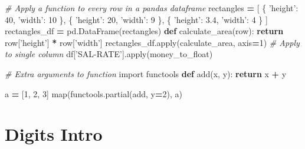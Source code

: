 \documentclass[]{book}
\newenvironment{Shaded}{\begin{snugshade}}{\end{snugshade}}
\newcommand{\KeywordTok}[1]{\textcolor[rgb]{0.13,0.29,0.53}{\textbf{#1}}}
\newcommand{\DecValTok}[1]{\textcolor[rgb]{0.00,0.00,0.81}{#1}}
\newcommand{\FloatTok}[1]{\textcolor[rgb]{0.00,0.00,0.81}{#1}}
\newcommand{\StringTok}[1]{\textcolor[rgb]{0.31,0.60,0.02}{#1}}
\newcommand{\ImportTok}[1]{#1}
\newcommand{\CommentTok}[1]{\textcolor[rgb]{0.56,0.35,0.01}{\textit{#1}}}
\newcommand{\ControlFlowTok}[1]{\textcolor[rgb]{0.13,0.29,0.53}{\textbf{#1}}}
\newcommand{\OperatorTok}[1]{\textcolor[rgb]{0.81,0.36,0.00}{\textbf{#1}}}
\newcommand{\BuiltInTok}[1]{#1}
\newcommand{\NormalTok}[1]{#1}
\theoremstyle{definition}
\theoremstyle{definition}
\theoremstyle{definition}
\theoremstyle{remark}
\begin{document}
\begin{Shaded}
\begin{Highlighting}[]
\CommentTok{# Apply a function to every row in a pandas dataframe}
\NormalTok{rectangles }\OperatorTok{=}\NormalTok{ [}
\NormalTok{    \{ }\StringTok{'height'}\NormalTok{: }\DecValTok{40}\NormalTok{, }\StringTok{'width'}\NormalTok{: }\DecValTok{10}\NormalTok{ \},}
\NormalTok{    \{ }\StringTok{'height'}\NormalTok{: }\DecValTok{20}\NormalTok{, }\StringTok{'width'}\NormalTok{: }\DecValTok{9}\NormalTok{ \},}
\NormalTok{    \{ }\StringTok{'height'}\NormalTok{: }\FloatTok{3.4}\NormalTok{, }\StringTok{'width'}\NormalTok{: }\DecValTok{4}\NormalTok{ \}}
\NormalTok{]}
\NormalTok{rectangles_df }\OperatorTok{=}\NormalTok{ pd.DataFrame(rectangles)}
\KeywordTok{def}\NormalTok{ calculate_area(row):}
    \ControlFlowTok{return}\NormalTok{ row[}\StringTok{'height'}\NormalTok{] }\OperatorTok{*}\NormalTok{ row[}\StringTok{'width'}\NormalTok{]}
\NormalTok{rectangles_df.}\BuiltInTok{apply}\NormalTok{(calculate_area, axis}\OperatorTok{=}\DecValTok{1}\NormalTok{)}
\CommentTok{# Apply to single column}
\NormalTok{df[}\StringTok{'SAL-RATE'}\NormalTok{].}\BuiltInTok{apply}\NormalTok{(money_to_float)}
\end{Highlighting}
\end{Shaded}

\begin{Shaded}
\begin{Highlighting}[]
\CommentTok{# Extra arguments to function}
\ImportTok{import}\NormalTok{ functools}
\KeywordTok{def}\NormalTok{ add(x, y):}
    \ControlFlowTok{return}\NormalTok{ x }\OperatorTok{+}\NormalTok{ y}
    
\NormalTok{a }\OperatorTok{=}\NormalTok{ [}\DecValTok{1}\NormalTok{, }\DecValTok{2}\NormalTok{, }\DecValTok{3}\NormalTok{]}
\BuiltInTok{map}\NormalTok{(functools.partial(add, y}\OperatorTok{=}\DecValTok{2}\NormalTok{), a)}
\end{Highlighting}
\end{Shaded}

\section{Digits Intro}\label{digits-intro}
\end{document}
